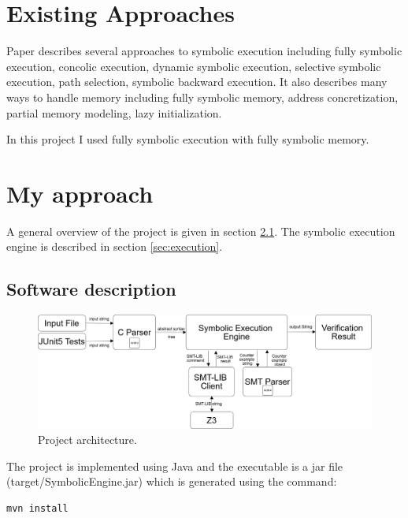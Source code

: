 \documentclass[12pt,a4paper]{article}
\begin{document}
\section{Existing Approaches}

Paper \cite{paper} describes several approaches to symbolic execution including fully symbolic execution,  concolic execution, dynamic symbolic execution, selective symbolic execution, path selection, symbolic backward execution. It also describes many ways to handle memory including  fully symbolic memory, address concretization, partial memory modeling, lazy initialization. 

In this project I used fully symbolic execution with fully symbolic memory. 

\section{My approach}

A general overview of the project is given in section \ref{sec:software}. The symbolic execution engine is described in section \ref{sec:execution}.

\subsection{Software description} \label{sec:software}


\begin{figure}[h]
 \centering
 \includegraphics[scale=.25,keepaspectratio=true]{./engine.png}
 \caption{Project architecture.}
 \label{fig:engine}
\end{figure}

The project is implemented using Java and the executable is a jar file (target/SymbolicEngine.jar) which is generated using the command:

\begin{lstlisting}  
mvn install
\end{lstlisting}  
\end{document}
